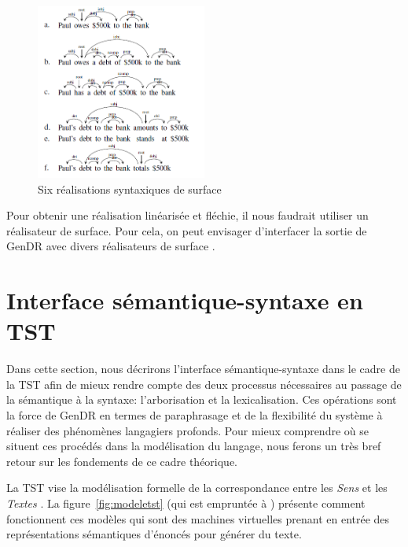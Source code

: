 \begin{figure}[htb]
	\centering
	\includegraphics[width=0.5\textwidth, trim = {0cm 0cm 0cm 0cm},clip]{ch3/figs/exemples_real.png}
	\caption{Six réalisations syntaxiques de surface \citep{lareau18}}
	\label{fig:6realsurf}
\end{figure}

Pour obtenir une réalisation linéarisée et fléchie, il nous faudrait utiliser un réalisateur de surface. Pour cela, on peut envisager d'interfacer la sortie de GenDR avec divers réalisateurs de surface \citep{DaoustJSREALTextRealizer2015, DBLP:conf/enlg/MolinsL15, GattSimpleNLGRealisationEngine2009, BelzFirstSurfaceRealisation2011}.


\section{Interface sémantique-syntaxe en TST}\label{sec:semsynt}

Dans cette section, nous décrirons l'interface sémantique-syntaxe dans le cadre de la \ac{TST} afin de mieux rendre compte des deux processus nécessaires au passage de la sémantique à la syntaxe: l'arborisation et la lexicalisation. Ces opérations sont la force de GenDR en termes de paraphrasage et de la flexibilité du système à réaliser des phénomènes langagiers profonds. Pour mieux comprendre où se situent ces procédés dans la modélisation du langage, nous ferons un très bref retour sur les fondements de ce cadre théorique.

La \ac{TST} vise la modélisation formelle de la correspondance entre les \emph{Sens} et les \emph{Textes} \citep{DBLP:conf/coling/JolkovskyM67, MelcukVerslinguistiqueSensTexte1997, PolgueretheorieSensTexte1998}. La figure~\ref{fig:modeletst} (qui est empruntée à \cite{PolgueretheorieSensTexte1998}) présente comment fonctionnent ces modèles qui sont des machines virtuelles prenant en entrée des représentations sémantiques d'énoncés pour générer du texte.

